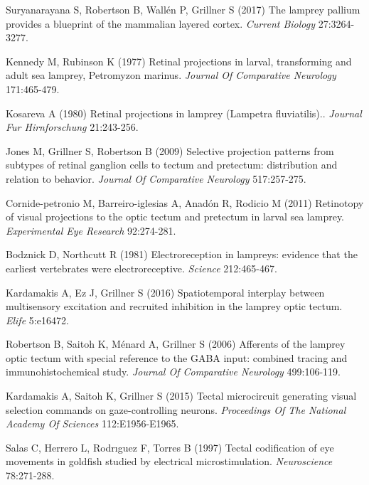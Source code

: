 \documentclass{ar-1col}
\begin{document}
{\begin{thebibliography}{00}
Suryanarayana S, Robertson B, Wall{\'e}n P, Grillner S (2017) 
The lamprey pallium provides a blueprint of the mammalian layered cortex.
\textit{ Current Biology} 27:3264-3277.

Kennedy M, Rubinson K (1977) 
Retinal projections in larval, transforming and adult sea lamprey, Petromyzon marinus.
\textit{ Journal Of Comparative Neurology} 171:465-479.

Kosareva A (1980) 
Retinal projections in lamprey (Lampetra fluviatilis)..
\textit{ Journal Fur Hirnforschung} 21:243-256.

Jones M, Grillner S, Robertson B (2009) 
Selective projection patterns from subtypes of retinal ganglion cells to tectum and pretectum: distribution and relation to behavior.
\textit{ Journal Of Comparative Neurology} 517:257-275.

Cornide-petronio M, Barreiro-iglesias A, Anad{\'o}n R, Rodicio M (2011) 
Retinotopy of visual projections to the optic tectum and pretectum in larval sea lamprey.
\textit{ Experimental Eye Research} 92:274-281.

Bodznick D, Northcutt R (1981) 
Electroreception in lampreys: evidence that the earliest vertebrates were electroreceptive.
\textit{ Science} 212:465-467.

Kardamakis A, Ez J, Grillner S (2016) 
Spatiotemporal interplay between multisensory excitation and recruited inhibition in the lamprey optic tectum.
\textit{ Elife} 5:e16472.

Robertson B, Saitoh K, M{\'e}nard A, Grillner S (2006) 
Afferents of the lamprey optic tectum with special reference to the GABA input: combined tracing and immunohistochemical study.
\textit{ Journal Of Comparative Neurology} 499:106-119.

Kardamakis A, Saitoh K, Grillner S (2015) 
Tectal microcircuit generating visual selection commands on gaze-controlling neurons.
\textit{ Proceedings Of The National Academy Of Sciences} 112:E1956-E1965.

Salas C, Herrero L, Rodr{\i}guez F, Torres B (1997) 
Tectal codification of eye movements in goldfish studied by electrical microstimulation.
\textit{ Neuroscience} 78:271-288.


\end{thebibliography}}
\end{document}
